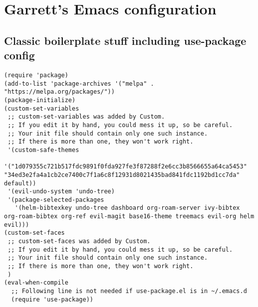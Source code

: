 \documentclass[11pt]{article}
\author{Garrett Finucane}
\date{\today}
\title{}
\begin{document}
\tableofcontents

\section{Garrett's Emacs configuration}
\label{sec:org665fa48}
\subsection{Classic boilerplate stuff including use-package config}
\label{sec:orgdc1d8a3}
\begin{verbatim}
(require 'package)
(add-to-list 'package-archives '("melpa" . "https://melpa.org/packages/"))
(package-initialize)
(custom-set-variables
 ;; custom-set-variables was added by Custom.
 ;; If you edit it by hand, you could mess it up, so be careful.
 ;; Your init file should contain only one such instance.
 ;; If there is more than one, they won't work right.
 '(custom-safe-themes
   '("1d079355c721b517fdc9891f0fda927fe3f87288f2e6cc3b8566655a64ca5453" "34ed3e2fa4a1cb2ce7400c7f1a6c8f12931d8021435bad841fdc1192bd1cc7da" default))
 '(evil-undo-system 'undo-tree)
 '(package-selected-packages
   '(helm-bibtexkey undo-tree dashboard org-roam-server ivy-bibtex org-roam-bibtex org-ref evil-magit base16-theme treemacs evil-org helm evil)))
(custom-set-faces
 ;; custom-set-faces was added by Custom.
 ;; If you edit it by hand, you could mess it up, so be careful.
 ;; Your init file should contain only one such instance.
 ;; If there is more than one, they won't work right.
 )
(eval-when-compile
  ;; Following line is not needed if use-package.el is in ~/.emacs.d
  (require 'use-package))
\end{verbatim}
\end{document}
